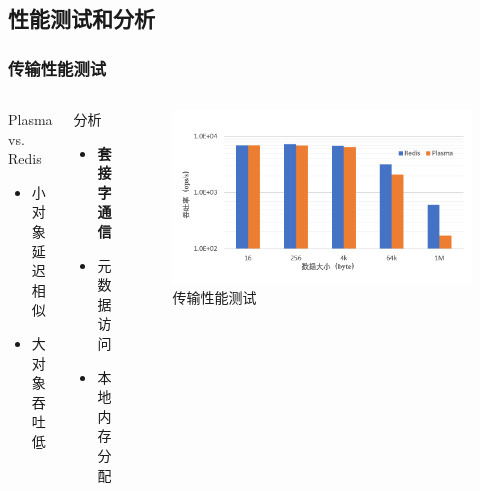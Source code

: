\subsection*{性能测试和分析}
\begin{frame}
	\frametitle{传输性能测试}

	\begin{columns}[t]
		\begin{block}{Plasma vs. Redis}
			\begin{itemize}
				\item 小对象延迟相似
				\item 大对象吞吐低
			\end{itemize}
		\end{block}
		\begin{block}{分析}
			\begin{itemize}
				\item \textbf{套接字通信}
				\item 元数据访问
				\item 本地内存分配
			\end{itemize}
		\end{block}
		\begin{figure}
			\centering
			\includegraphics[width=\textwidth]{image/chap02/fetch.png}
			\caption{传输性能测试}
		\end{figure}
	\end{columns}
\end{frame}
